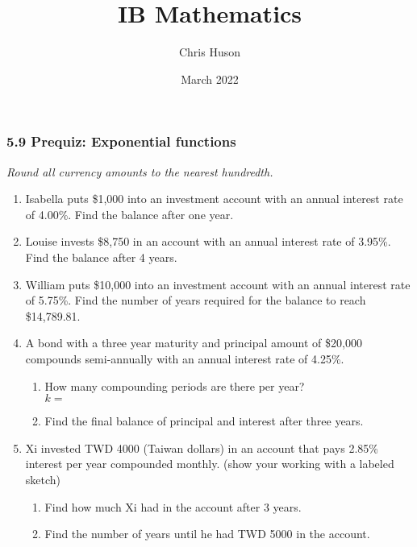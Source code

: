 \documentclass[12pt, twoside]{article}
\title{IB Mathematics}
\author{Chris Huson}
\date{March 2022}
\begin{document}
\subsubsection*{5.9 Prequiz: Exponential functions}
\emph{Round all currency amounts to the nearest hundredth.}
\begin{enumerate}
\item Isabella puts \$1,000 into an investment account with an annual interest rate of 4.00\%. Find the balance after one year. \vspace{1.5cm}

\item Louise invests \$8,750 in an account with an annual interest rate of 3.95\%. Find the balance after 4 years. \vspace{1.5cm}

\item William puts \$10,000 into an investment account with an annual interest rate of 5.75\%. Find the number of years required for the balance to reach \$14,789.81. \vspace{2cm}

\item A bond with a three year maturity and principal amount of \$20,000 compounds semi-annually with an annual interest rate of 4.25\%.
\begin{enumerate}[itemsep=0.5cm]
    \item How many compounding periods are there per year? \\[0.25cm]
    $k=$
    \item Find the final balance of principal and interest after three years.
\end{enumerate} \vspace{1.5cm}

\item Xi invested TWD 4000 (Taiwan dollars) in an account that pays 2.85\% interest per year compounded monthly. (show your working with a labeled sketch)
\begin{multicols}{2}
    \begin{enumerate}[itemsep=1cm]
        \item Find how much Xi had in the account after 3 years.
        \item Find the number of years until he had TWD 5000 in the account.
    \end{enumerate} \vspace{0.5cm}
    \begin{center}
    \end{center}
\end{multicols}



\end{enumerate}
\end{document}

